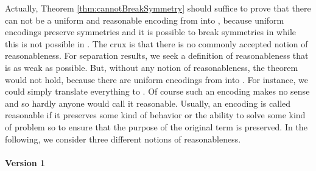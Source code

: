\documentclass[11pt,techReport]{eptcs}
\begin{document}





Actually, Theorem \ref{thm:cannotBreakSymmetry} should suffice to prove that there can not be a uniform and reasonable encoding from \pimix into \pisep, because uniform encodings preserve symmetries and it is possible to break symmetries in \pimix while this is not possible in \pisep. The crux is that there is no commonly accepted notion of reasonableness. For separation results, we seek a definition of reasonableness that is as weak as possible. But, without any notion of reasonableness, the theorem would not hold, because there are uniform encodings from \pimix into \pisep. For instance, we could simply translate everything to . Of course such an encoding makes no sense and so hardly anyone would call it reasonable. Usually, an encoding is called reasonable if it preserves some kind of behavior or the ability to solve some kind of problem so to ensure that the purpose of the original term is preserved.  In the following, we consider three different notions of reasonableness.

\paragraph{Version 1}
\end{document}

